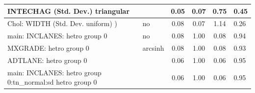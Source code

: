 \begin{table}
\begin{center}
\begin{tabular}{|l|l|c|c|c|l|}
			\hline
			INTECHAG (Std. Dev.) triangular &  & 0.05 & 0.07 & 0.75 & 0.45 \\
			\hline
			 Chol: WIDTH (Std. Dev. uniform) ) & no & 0.08 & 0.07 & 1.14 & 0.26 \\
			\hline
			main: INCLANES: hetro group 0 & no & 0.08 & 1.00 & 0.08 & 0.94 \\
			\hline
			MXGRADE: hetro group 0 & arcsinh & 0.08 & 1.00 & 0.08 & 0.93 \\
			\hline
			ADTLANE: hetro group 0 &  & 0.06 & 1.00 & 0.06 & 0.95 \\
			\hline
			main: INCLANES: hetro group 0:tn_normal:sd  hetro group 0 &  & 0.06 & 1.00 & 0.06 & 0.95 \\
			\hline
		\end{tabular}
	\end{center}
\end{table}